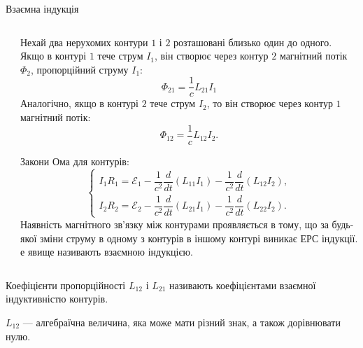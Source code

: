 \documentclass[onlytextwidth]{beamer}
\begin{document}
\begin{frame}{Взаємна індукція}{}
	\begin{columns}
		\begin{column}{0.4\linewidth}\centering
			\begin{pict}\centering
				
			\end{pict}
		\end{column}
		\begin{column}{0.59\linewidth}
			\begin{overprint}
				\begin{block}{}\justifying
					Нехай два нерухомих контури $1$ і $2$ розташовані близько один до одного. Якщо в контурі $1$ тече струм $I_1$, він створює через контур
					$2$ магнітний потік $\Phi_2$, пропорційний струму $I_1$:
					\begin{equation*}
						\Phi_{21} = \frac1c L_{21}I_1
					\end{equation*}
					Аналогічно, якщо в контурі $2$ тече струм $I_2$, то він створює через контур $1$ магнітний потік:
					\begin{equation*}
						\Phi_{12} = \frac1c L_{12}I_2.
					\end{equation*}
				\end{block}
				\begin{block}{}\justifying
					Закони Ома для контурів:
					\begin{equation*}
						\begin{cases}
							I_1R_1 = \mathcal{E}_1 - \dfrac1{c^2}\dfrac{d}{dt}\left( L_{11} I_1\right) - \dfrac1{c^2}\dfrac{d}{dt}\left( L_{12} I_2\right),
							\\[1,5ex]
							I_2R_2 = \mathcal{E}_2 - \dfrac1{c^2}\dfrac{d}{dt}\left( L_{21} I_1\right) - \dfrac1{c^2}\dfrac{d}{dt}\left( L_{22} I_2\right).
						\end{cases}
					\end{equation*}
					Наявність магнітного зв'язку між контурами проявляється в тому, що за будь-якої зміни струму в одному з контурів в іншому контурі виникає
					ЕРС індукції. е явище називають \alert{взаємною індукцією}.
				\end{block}
			\end{overprint}
		\end{column}
	\end{columns}
	\begin{overprint}
		\onslide<1>
		\begin{block}{}\justifying
			Коефіцієнти пропорційності $L_{12}$ і $L_{21}$ називають \alert{коефіцієнтами взаємної індуктивністю} контурів.
		\end{block}
		\onslide<2>
		\begin{block}{}\justifying
			$L_{12}$ --- алгебраїчна величина, яка може мати різний знак, а також дорівнювати нулю.
		\end{block}
	\end{overprint}
\end{frame}
\end{document}
